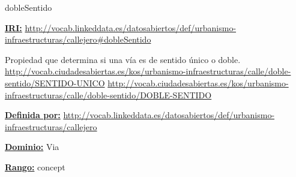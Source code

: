 \begin{mybox}{dobleSentido}
\begin{flushleft}
\underline{\textbf{IRI:}}
\url{http://vocab.linkeddata.es/datosabiertos/def/urbanismo-infraestructuras/callejero#dobleSentido}
\newline

Propiedad que determina si una vía es de sentido único o doble.
\newline \url{http://vocab.ciudadesabiertas.es/kos/urbanismo-infraestructuras/calle/doble-sentido/SENTIDO-UNICO}
\newline \url{http://vocab.ciudadesabiertas.es/kos/urbanismo-infraestructuras/calle/doble-sentido/DOBLE-SENTIDO}
\newline

\underline{\textbf{Definida por:}}\newline
\url{http://vocab.linkeddata.es/datosabiertos/def/urbanismo-infraestructuras/callejero}
\newline

\underline{\textbf{Dominio:}}
		Via
\newline

\underline{\textbf{Rango:}}
 concept
 \newline

\end{flushleft}
\end{mybox}












